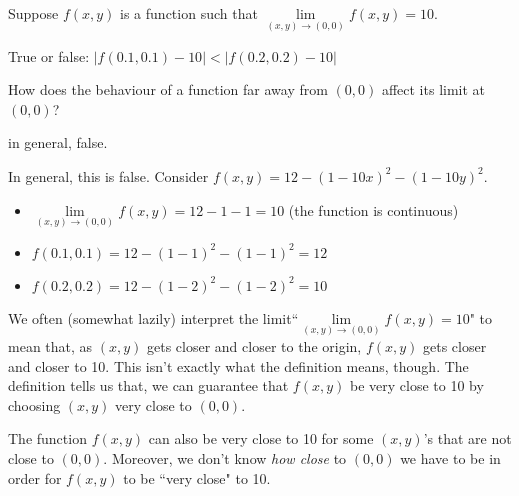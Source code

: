 


\subsection*{\Conceptual}
\begin{question}
Suppose $f(x,y)$ is a function such that 
         $\lim\limits_{(x,y)\to(0,0)}f(x,y)=10$. 

True or false: $|f(0.1,0.1)-10|<|f(0.2,0.2)-10|$
\end{question}
\begin{hint}
How does the behaviour of a function far away from $(0,0)$ affect its limit at $(0,0)$?
\end{hint}
\begin{answer}
in general, false.
\end{answer}
\begin{solution}
In general, this is false. Consider $f(x,y)=12-(1-10x)^2-(1-10y)^2$. 
\begin{itemize}
\item $\lim\limits_{(x,y)\to(0,0)}f(x,y)=12-1-1=10$ (the function is continuous)
\item $f(0.1,0.1)=12-(1-1)^2-(1-1)^2=12$
\item $f(0.2,0.2)=12-(1-2)^2-(1-2)^2=10$
\end{itemize}

We often (somewhat lazily) interpret the limit\quad ``$\lim\limits_{(x,y)\to(0,0)}f(x,y)=10$" \quad to mean that, as $(x,y)$ gets 
closer and closer to the origin, $f(x,y)$ gets closer and closer to 10. This 
isn't exactly what the definition means, though. The definition tells us that, 
we can guarantee that $f(x,y)$ be very close to 10 by choosing 
$(x,y)$ very close to $(0,0)$.

The function $f(x,y)$ can also be very close to 10 for some $(x,y)$'s that are not close to $(0,0)$. Moreover, we don't know \emph{how close} to $(0,0)$ 
we have to be in order for $f(x,y)$ to be ``very close" to 10.
\end{solution}

